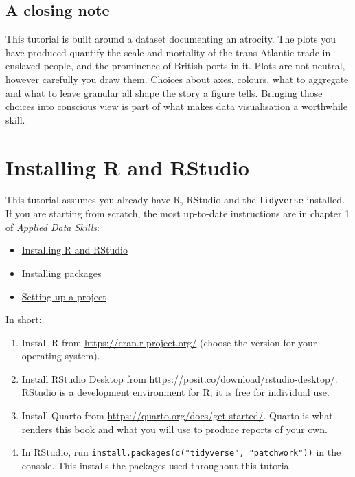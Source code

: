 \documentclass[
  english,
  letterpaper,
]{book}
\providecommand{\tightlist}{%
  \setlength{\itemsep}{0pt}\setlength{\parskip}{0pt}}
\begin{document}
\section{A closing note}\label{a-closing-note}

This tutorial is built around a dataset documenting an atrocity. The
plots you have produced quantify the scale and mortality of the
trans-Atlantic trade in enslaved people, and the prominence of British
ports in it. Plots are not neutral, however carefully you draw them.
Choices about axes, colours, what to aggregate and what to leave
granular all shape the story a figure tells. Bringing those choices into
conscious view is part of what makes data visualisation a worthwhile
skill.

\cleardoublepage
{}
{}
\appendix

\chapter{Installing R and RStudio}\label{sec-installing-r}

This tutorial assumes you already have R, RStudio and the
\texttt{tidyverse} installed. If you are starting from scratch, the most
up-to-date instructions are in chapter 1 of \emph{Applied Data Skills}:

\begin{itemize}
\tightlist
\item
  \href{https://psyteachr.github.io/ads-v3/01-intro.html\#sec-install-r}{Installing
  R and RStudio}
\item
  \href{https://psyteachr.github.io/ads-v3/01-intro.html\#sec-install-package}{Installing
  packages}
\item
  \href{https://psyteachr.github.io/ads-v3/01-intro.html\#sec-rproj}{Setting
  up a project}
\end{itemize}

In short:

\begin{enumerate}
\def\labelenumi{\arabic{enumi}.}
\tightlist
\item
  Install R from \url{https://cran.r-project.org/} (choose the version
  for your operating system).
\item
  Install RStudio Desktop from
  \url{https://posit.co/download/rstudio-desktop/}. RStudio is a
  development environment for R; it is free for individual use.
\item
  Install Quarto from \url{https://quarto.org/docs/get-started/}. Quarto
  is what renders this book and what you will use to produce reports of
  your own.
\item
  In RStudio, run
  \texttt{install.packages(c("tidyverse",\ "patchwork"))} in the
  console. This installs the packages used throughout this tutorial.
\end{enumerate}
\end{document}
